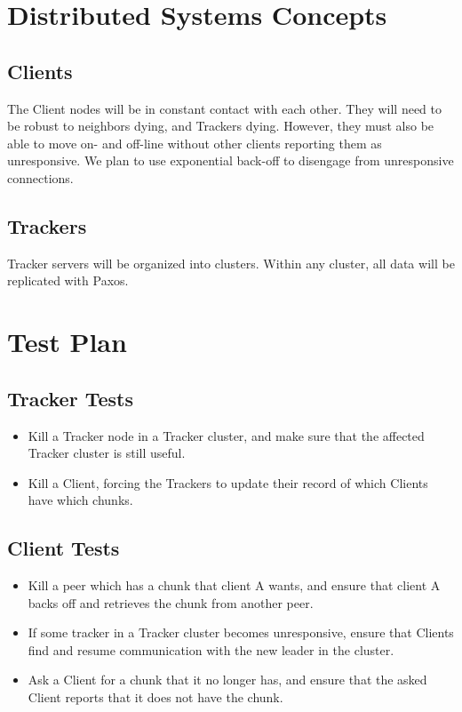 \documentclass[12pt]{article}
\begin{document}
\section*{Distributed Systems Concepts}

\subsection*{Clients}
The Client nodes will be in constant contact with each other.
They will need to be robust to neighbors dying, and Trackers dying.
However, they must also be able to move on- and off-line without other clients
reporting them as unresponsive.
We plan to use exponential back-off to disengage from unresponsive connections.

\subsection*{Trackers}
Tracker servers will be organized into clusters.
Within any cluster, all data will be replicated with Paxos.


\section*{Test Plan}

\subsection*{Tracker Tests}
\begin{itemize}
\item  Kill a Tracker node in a Tracker cluster,
       and make sure that the affected Tracker cluster is still useful.
\item  Kill a Client, forcing the Trackers to update their record of which
       Clients have which chunks.
\end{itemize}

\subsection*{Client Tests}
\begin{itemize}
\item  Kill a peer which has a chunk that client A wants, and ensure that
       client A backs off and retrieves the chunk from another peer.
\item  If some tracker in a Tracker cluster becomes unresponsive, ensure that
       Clients find and resume communication with the new leader in the cluster.
\item  Ask a Client for a chunk that it no longer has, and ensure that the asked
       Client reports that it does not have the chunk.
\end{itemize}
\end{document}
